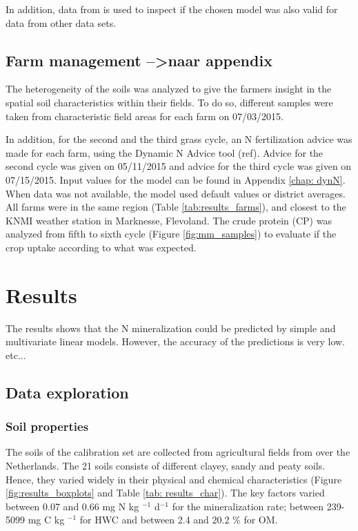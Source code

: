 \documentclass[10pt,twoside,dutch,english]{report}
\begin{document}
In addition, data from\citet{Ros2011} is used to inspect if the chosen model was also valid for data from other data sets. 


\section{Farm management -->naar appendix }
The heterogeneity of the soils was analyzed to give the farmers insight in the spatial soil characteristics within their fields. To do so, different samples were taken from characteristic field areas for each farm on 07/03/2015. 

In addition, for the second and the third grass cycle, an N fertilization advice was made for each farm, using the Dynamic N Advice tool (ref). Advice for the second cycle was given on 05/11/2015  and advice for the third cycle was given on 07/15/2015. Input values for the model can be found in Appendix \ref{chap: dynN}. When data was not available, the model used default values or district averages. All farms were in the same region (Table \ref{tab:results_farms}), and closest to the KNMI weather station in Marknesse, Flevoland. The crude protein (CP) was analyzed from fifth to sixth cycle (Figure \ref{fig:mm_samples}) to evaluate if the crop uptake according to what was expected. 



\chapter{Results}

The results shows that the N mineralization could be predicted by simple and multivariate linear models. However, the accuracy of the predictions is very low. etc... %
\section{Data exploration}
\subsection{Soil properties}
The soils of the calibration set are collected from agricultural fields from over the Netherlands. The 21 soils consists of different clayey, sandy and peaty soils. Hence, they varied widely in their physical and chemical characteristics (Figure \ref{fig:results_boxplots} and Table \ref{tab: results_char}). The key factors varied between 0.07 and 0.66 mg N kg $^{-1}$ d$^{-1}$ for the mineralization rate; between 239-5099 mg C kg $^{-1}$ for HWC and between 2.4 and 20.2 \% for OM. 
\end{document}

